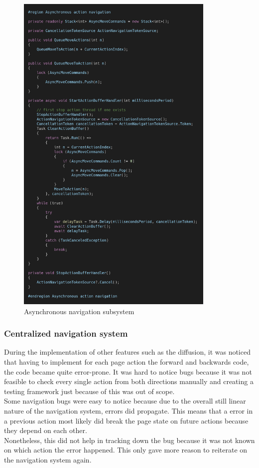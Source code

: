 \begin{figure}
\centering
\includegraphics[width=0.85\textwidth]{figures/code/nav-arch/async-navigation.png}
\caption{Asynchronous navigation subsystem}
\label{fig:async.navigation}
\end{figure}

\FloatBarrier

\subsubsection{Centralized navigation system}

During the implementation of other features such as the diffusion, it was noticed that having to implement for each page action the forward and backwards code, the code became quite error-prone. It was hard to notice bugs because it was not feasible to check every single action from both directions manually and creating a testing framework just because of this was out of scope. \\
Some navigation bugs were easy to notice because due to the overall still linear nature of the navigation system, errors did propagate. This means that a error in a previous action most likely did break the page state on future actions because they depend on each other. \\
Nonetheless, this did not help in tracking down the bug because it was not known on which action the error happened. This only gave more reason to reiterate on the navigation system again.


